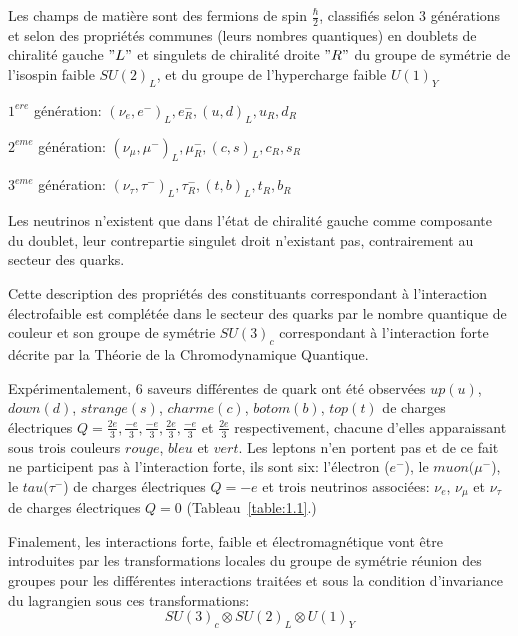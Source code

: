 Les champs de mati\`ere sont des fermions de spin $\frac{\hbar}{2}$, classifi\'es selon 3 g\'en\'erations et selon des propri\'et\'es communes (leurs nombres quantiques) en doublets de chiralit\'e gauche $"L"$ et singulets de chiralit\'e droite $"R"$ du groupe de sym\'etrie de l'isospin faible $SU(2)_{L}$, et du groupe de l'hypercharge faible $U(1)_{Y}$
~\par $1^{ere}$ g\'en\'eration: $({\nu}_{e},e^{-})_{L}, e^{-}_{R}, (u,d)_{L}, u_{R}, d_{R}$
~\par $2^{eme}$ g\'en\'eration: $({\nu}_{\mu},\mu^{-})_{L}, \mu^{-}_{R}, (c,s)_{L}, c_{R}, s_{R}$
~\par $3^{eme}$ g\'en\'eration: $({\nu}_{\tau},\tau^{-})_{L}, \tau^{-}_{R}, (t,b)_{L}, t_{R}, b_{R}$
~\par Les neutrinos n'existent que dans l'\'etat de chiralit\'e gauche comme composante du doublet, leur contrepartie singulet droit n'existant pas, contrairement au secteur des quarks.
~\par Cette description des propri\'et\'es des constituants correspondant \`a l'interaction \'electrofaible est compl\'et\'ee dans le secteur des quarks par le nombre quantique de couleur et son groupe de sym\'etrie $SU(3)_{c}$ correspondant \`a l'interaction forte d\'ecrite par la Th\'eorie de la Chromodynamique Quantique.
~\par Exp\'erimentalement, 6 saveurs diff\'erentes de quark ont \'et\'e observ\'ees $up (u)$, $down (d)$, $strange (s)$, $charme (c)$, $botom (b)$, $top (t)$ de charges \'electriques $Q=\frac{2e}{3}, \frac{-e}{3}, \frac{-e}{3}, \frac{2e}{3}, \frac{-e}{3}$ et $\frac{2e}{3}$ respectivement, chacune d'elles apparaissant sous trois couleurs $rouge$, $bleu$ et $vert$. Les leptons n'en portent pas et de ce fait ne participent pas \`a l'interaction forte, ils sont six: l'\'electron ($e^-$), le $muon (\mu^-$), le $tau (\tau^-$) de charges \'electriques $Q=-e$ et trois neutrinos associ\'ees: $\nu_e$, $\nu_\mu$ et $\nu_\tau$ de charges \'electriques $Q=0$ (Tableau~\ref{table:1.1}.)
~\par Finalement, les interactions forte, faible et \'electromagn\'etique vont \^etre introduites par les transformations locales du groupe de sym\'etrie r\'eunion des groupes pour les diff\'erentes interactions trait\'ees et sous la condition d'invariance du lagrangien sous ces transformations: 
$${SU(3)_c}\otimes{SU(2)_L}\otimes{U(1)_Y}$$

